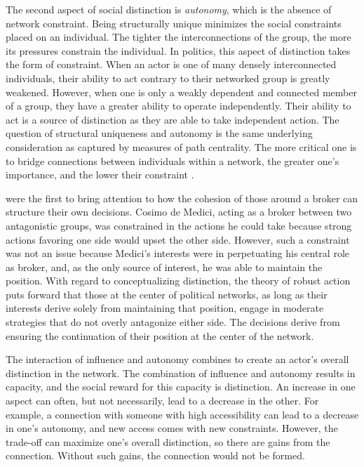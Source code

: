 \documentclass[12pt]{article}
\begin{document}
The second aspect of social distinction is \textit{autonomy}, which is the absence of network constraint. Being structurally unique minimizes the social constraints placed on an individual. The tighter the interconnections of the group, the more its pressures constrain the individual. In politics, this aspect of distinction takes the form of constraint. When an actor is one of many densely interconnected individuals, their ability to act contrary to their networked group is greatly weakened. However, when one is only a weakly dependent and connected member of a group, they have a greater ability to operate independently. Their ability to act is a source of distinction as they are able to take independent action. The question of structural uniqueness and autonomy is the same underlying consideration as captured by measures of path centrality. The more critical one is to bridge connections between individuals within a network, the greater one's importance, and the lower their constraint \citep{burt92}. 

\citet[1263-4]{padgett_ansell94} were the first to bring attention to how the cohesion of those around a broker can structure their own decisions. Cosimo de Medici, acting as a broker between two antagonistic groups, was constrained in the actions he could take because strong actions favoring one side would upset the other side. However, such a constraint was not an issue because Medici’s interests were in perpetuating his central role as broker, and, as the only source of interest, he was able to maintain the position. With regard to conceptualizing distinction, the theory of robust action puts forward that those at the center of political networks, as long as their interests derive solely from maintaining that position, engage in moderate strategies that do not overly antagonize either side. The decisions derive from ensuring the continuation of their position at the center of the network. 






The interaction of influence and autonomy combines to create an actor’s overall distinction in the network. The combination of influence and autonomy results in capacity, and the social reward for this capacity is distinction. An increase in one aspect can often, but not necessarily, lead to a decrease in the other. For example, a connection with someone with high accessibility can lead to a decrease in one’s autonomy, and new access comes with new constraints. However, the trade-off can maximize one’s overall distinction, so there are gains from the connection. Without such gains, the connection would not be formed.

\newpage


\newpage


\end{document}
